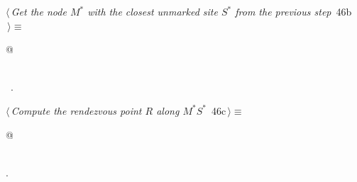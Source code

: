 \documentclass[11.5pt]{report}
\begin{document}
\vspace{-0.8cm}\newchunk
\begin{flushleft} \small
\begin{minipage}{\linewidth}\label{scrap68}\raggedright\small
{} $\langle\,${\itshape Get the node $M^{*}$ with the closest unmarked site $S^{*}$ from the previous step}\nobreak\ {\footnotesize {46b}}$\,\rangle\equiv$
\vspace{-1ex}
\begin{list}{}{} \item
\mbox{}\verb@   @\\
\mbox{}\verb@pass@\\
\mbox{}\verb@@{\NWsep}
\end{list}
\vspace{-1.5ex}
\footnotesize
\begin{list}{}{\setlength{\itemsep}{-\parsep}\setlength{\itemindent}{-\leftmargin}}
\item \NWtxtMacroRefIn\ .

\item{}
\end{list}
\end{minipage}\vspace{4ex}
\end{flushleft}

\vspace{-0.8cm} \newchunk
\begin{flushleft} \small
\begin{minipage}{\linewidth}\label{scrap69}\raggedright\small
{} $\langle\,${\itshape Compute the rendezvous point $R$ along $M^{*}S^{*}$}\nobreak\ {\footnotesize {46c}}$\,\rangle\equiv$
\vspace{-1ex}
\begin{list}{}{} \item
\mbox{}\verb@   @\\
\mbox{}\verb@pass@\\
\mbox{}\verb@@{\NWsep}
\end{list}
\vspace{-1.5ex}
\footnotesize
\begin{list}{}{\setlength{\itemsep}{-\parsep}\setlength{\itemindent}{-\leftmargin}}
\item {\NWtxtMacroNoRef}.

\item{}
\end{list}
\end{minipage}\vspace{4ex}
\end{flushleft}
\end{document}
